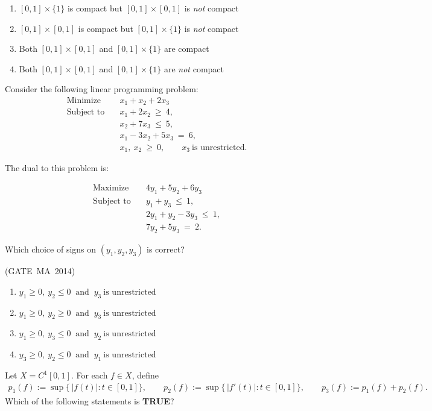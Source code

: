 \documentclass[journal,12pt,onecolumn]{IEEEtran}
\theoremstyle{remark}
\begin{document}
\begin{enumerate}
{\begin{enumerate}
\item $[0,1]\times\{1\}$ is compact but $[0,1]\times[0,1]$ is \emph{not} compact
\item $[0,1]\times[0,1]$ is compact but $[0,1]\times\{1\}$ is \emph{not} compact
\item Both $[0,1]\times[0,1]$ and $[0,1]\times\{1\}$ are compact
\item Both $[0,1]\times[0,1]$ and $[0,1]\times\{1\}$ are \emph{not} compact
\end{enumerate}
\item Consider the following linear programming problem:
\begin{align*}
\text{Minimize}\quad & x_1+x_2+2x_3\\
\text{Subject to}\quad 
& x_1+2x_2 \ \ge\ 4,\\
& x_2+7x_3 \ \le\ 5,\\
& x_1-3x_2+5x_3 \ =\ 6,\\
& x_1,\ x_2 \ \ge\ 0,\qquad x_3\ \text{is unrestricted.}
\end{align*}


The dual to this problem is:

\begin{align*}   
\text{Maximize}\quad & 4y_1+5y_2+6y_3\\
\text{Subject to}\quad 
& y_1+y_3 \ \le\ 1,\\
& 2y_1+y_2-3y_3 \ \le\ 1,\\
& 7y_2+5y_3 \ =\ 2.
\end{align*}



Which choice of signs on $(y_1,y_2,y_3)$ is correct?

\hfill\mbox{(GATE MA 2014)}

\begin{enumerate}
\item $y_1\ge 0,\ y_2\le 0\ \text{ and }\ y_3\ \text{is unrestricted}$
\item $y_1\ge 0,\ y_2\ge 0\ \text{ and }\ y_3\ \text{is unrestricted}$
\item $y_1\ge 0,\ y_3\le 0\ \text{ and }\ y_2\ \text{is unrestricted}$
\item $y_3\ge 0,\ y_2\le 0\ \text{ and }\ y_1\ \text{is unrestricted}$
\end{enumerate}
\item Let $X=C^{1}[0,1]$. For each $f\in X$, define
\begin{align*}
p_{1}(f):=\sup\{\,|f(t)|: t\in[0,1]\},\qquad
p_{2}(f):=\sup\{\,|f'(t)|: t\in[0,1]\},\qquad
p_{3}(f):=p_{1}(f)+p_{2}(f).
\end{align*}
Which of the following statements is \textbf{TRUE}?
\hfill{}

}
\end{enumerate}
\end{document}
